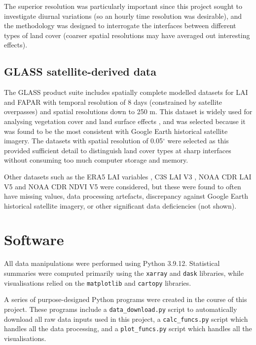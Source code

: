 The superior resolution was particularly important since this project sought to investigate diurnal variations (so an hourly time resolution was desirable), and the methodology was designed to interrogate the interfaces between different types of land cover (coarser spatial resolutions may have averaged out interesting effects).

\subsection{GLASS satellite-derived data}

The \ac{GLASS} product suite includes spatially complete modelled datasets for \ac{LAI} and \ac{FAPAR} with temporal resolution of 8 days (constrained by satellite overpasses) and spatial resolutions down to 250 m. This dataset is widely used for analysing vegetation cover and land surface effects \citep{fang2019, liang2021}, and was selected because it was found to be the most consistent with Google Earth historical satellite imagery. The datasets with spatial resolution of 0.05$^\circ$ were selected as this provided sufficient detail to distinguish land cover types at sharp interfaces without consuming too much computer storage and memory.

Other datasets such as the \ac{ERA5} \ac{LAI} variables \citep{era5}, \ac{C3S} \ac{LAI} V3 \citep{c3s}, \ac{NOAA} \ac{CDR} \ac{LAI} V5 \citep{lai_noaa} and \ac{NOAA} \ac{CDR} \ac{NDVI} V5 \citep{ndvi_noaa} were considered, but these were found to often have missing values, data processing artefacts, discrepancy against Google Earth historical satellite imagery, or other significant data deficiencies (not shown).

\section{Software}

All data manipulations were performed using Python 3.9.12. Statistical summaries were computed primarily using the \verb+xarray+ \citep{xarray} and \verb+dask+ \citep{dask} libraries, while visualisations relied on the \verb+matplotlib+ \citep{matplotlib} and \verb+cartopy+ \citep{cartopy} libraries.

A series of purpose-designed Python programs were created in the course of this project. These programs include a \verb+data_download.py+ script to automatically download all raw data inputs used in this project, a \verb+calc_funcs.py+ script which handles all the data processing, and a \verb+plot_funcs.py+ script which handles all the visualisations. 

